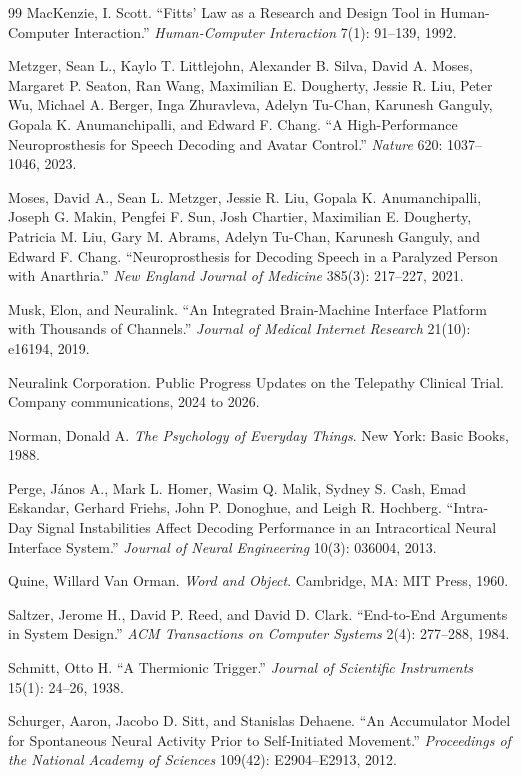 \documentclass[11pt,twoside,openany]{book}
\theoremstyle{definition}
\theoremstyle{remark}
\begin{document}
\begin{thebibliography}{99}
 MacKenzie, I. Scott. ``Fitts' Law as a Research and Design Tool in Human-Computer Interaction.'' \textit{Human-Computer Interaction} 7(1): 91--139, 1992.

 Metzger, Sean L., Kaylo T. Littlejohn, Alexander B. Silva, David A. Moses, Margaret P. Seaton, Ran Wang, Maximilian E. Dougherty, Jessie R. Liu, Peter Wu, Michael A. Berger, Inga Zhuravleva, Adelyn Tu-Chan, Karunesh Ganguly, Gopala K. Anumanchipalli, and Edward F. Chang. ``A High-Performance Neuroprosthesis for Speech Decoding and Avatar Control.'' \textit{Nature} 620: 1037--1046, 2023.

 Moses, David A., Sean L. Metzger, Jessie R. Liu, Gopala K. Anumanchipalli, Joseph G. Makin, Pengfei F. Sun, Josh Chartier, Maximilian E. Dougherty, Patricia M. Liu, Gary M. Abrams, Adelyn Tu-Chan, Karunesh Ganguly, and Edward F. Chang. ``Neuroprosthesis for Decoding Speech in a Paralyzed Person with Anarthria.'' \textit{New England Journal of Medicine} 385(3): 217--227, 2021.

 Musk, Elon, and Neuralink. ``An Integrated Brain-Machine Interface Platform with Thousands of Channels.'' \textit{Journal of Medical Internet Research} 21(10): e16194, 2019.

 Neuralink Corporation. Public Progress Updates on the Telepathy Clinical Trial. Company communications, 2024 to 2026.

 Norman, Donald A. \textit{The Psychology of Everyday Things}. New York: Basic Books, 1988.

 Perge, J\'anos A., Mark L. Homer, Wasim Q. Malik, Sydney S. Cash, Emad Eskandar, Gerhard Friehs, John P. Donoghue, and Leigh R. Hochberg. ``Intra-Day Signal Instabilities Affect Decoding Performance in an Intracortical Neural Interface System.'' \textit{Journal of Neural Engineering} 10(3): 036004, 2013.

 Quine, Willard Van Orman. \textit{Word and Object}. Cambridge, MA: MIT Press, 1960.

 Saltzer, Jerome H., David P. Reed, and David D. Clark. ``End-to-End Arguments in System Design.'' \textit{ACM Transactions on Computer Systems} 2(4): 277--288, 1984.

 Schmitt, Otto H. ``A Thermionic Trigger.'' \textit{Journal of Scientific Instruments} 15(1): 24--26, 1938.

 Schurger, Aaron, Jacobo D. Sitt, and Stanislas Dehaene. ``An Accumulator Model for Spontaneous Neural Activity Prior to Self-Initiated Movement.'' \textit{Proceedings of the National Academy of Sciences} 109(42): E2904--E2913, 2012.


\end{thebibliography}
\end{document}
